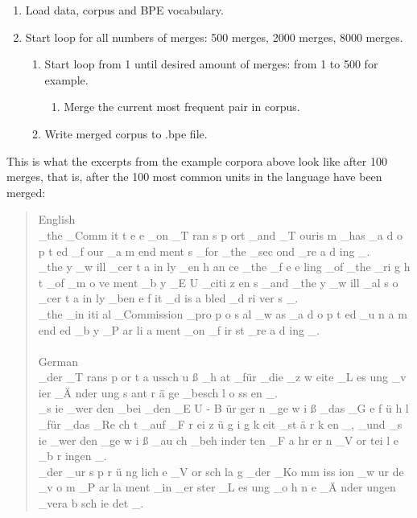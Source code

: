 \begin{enumerate}
	\item Load data, corpus and BPE vocabulary.
	\item Start loop for all numbers of merges: 500 merges, 2000 merges, 8000 merges.
	\begin{enumerate}
		\item Start loop from 1 until desired amount of merges: from 1 to 500 for example.
		\begin{enumerate}
			\item Merge the current most frequent pair in corpus.
		\end{enumerate}
		\item Write merged corpus to .bpe file.
	\end{enumerate}
\end{enumerate}

\clearpage
This is what the excerpts from the example corpora above look like after 100 merges, that is, after the 100 most common units in the language have been merged:

\begin{quote}
	English\\
	\_the \_Comm it t e e \_on \_T ran s p ort \_and \_T ouris m \_has \_a d o p t ed \_f our \_a m end ment s \_for \_the \_sec ond \_re a d ing \_.\\
	\_the y \_w ill \_cer t a in ly \_en h an ce \_the \_f e e ling \_of \_the \_ri g h t \_of \_m o ve ment \_b y \_E U \_citi z en s \_and \_the y \_w ill \_al s o \_cer t a in ly \_ben e f it \_d is a bled \_d ri ver s \_.\\
	\_the \_in iti al \_Commission \_pro p o s al \_w as \_a d o p t ed \_u n a m end ed \_b y \_P ar li a ment \_on \_f ir st \_re a d ing \_.\\\\
	German\\
	\_der \_T rans p or t a ussch u ß \_h at \_für \_die \_z w eite \_L es ung \_v ier \_Ä nder ung s ant r ä ge \_besch l o ss en \_.\\
	\_s ie \_wer den \_bei \_den \_E U - B ür ger n \_ge w i ß \_das \_G e f ü h l \_für \_das \_Re ch t \_auf \_F r ei z ü g i g k eit \_st ä r k en \_, \_und \_s ie \_wer den \_ge w i ß \_au ch \_beh inder ten \_F a hr er n \_V or tei l e \_b r ingen \_.\\
	\_der \_ur s p r ü ng lich e \_V or sch la g \_der \_Ko mm iss ion \_w ur de \_v o m \_P ar la ment \_in \_er ster \_L es ung \_o h n e \_Ä nder ungen \_vera b sch ie det \_.
\end{quote}

